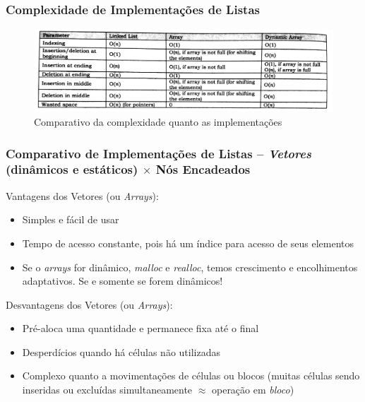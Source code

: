 
\begin{frame}%
\frametitle{Complexidade de Implementações de Listas}

\begin{figure}[!ht]
	\centering
	\includegraphics[height=0.560\paperheight, width=0.8\paperwidth]{figs/fig_listas/compara_implementacao_listas}
\caption{Comparativo da complexidade quanto as implementações}
	\end{figure} 

\end{frame} 

\begin{frame}
\frametitle{Comparativo de Implementações de Listas --
\textit{Vetores} (dinâmicos e estáticos) $\times$ Nós Encadeados}

\begin{block}{Vantagens dos Vetores (ou \textit{Arrays}):}
\begin{itemize}
  \item Simples e fácil de usar
  \item Tempo de acesso constante, pois há um índice para acesso
  de seus elementos
  \item Se o \textit{arrays} for dinâmico, \textit{malloc} e \textit{realloc}, temos crescimento e encolhimentos adaptativos. Se e somente se forem dinâmicos!
\end{itemize}
\end{block}

\begin{block}{Desvantagens dos Vetores (ou \textit{Arrays}):}
\begin{itemize}
  \item Pré-aloca uma quantidade e permanece fixa até o final
  \item Desperdícios quando há células não utilizadas
  \item Complexo quanto a movimentações de células ou blocos (muitas células sendo inseridas ou excluídas simultaneamente $\approx $ operação em \textit{bloco})
\end{itemize}

\end{block}

\end{frame} 


